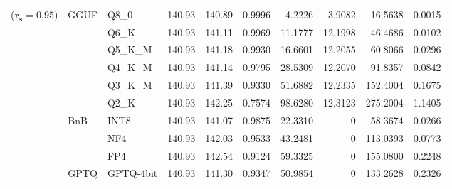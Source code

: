 \begin{table}[t]
{\begin{tabular}{ll l rrrrrrr}
{\small ($\mathbf{r_s{=}0.95}$)} & GGUF & Q8\_0 & 140.93 & 140.89 & 0.9996 & 4.2226 & 3.9082 & 16.5638 & 0.0015 \\
 &  & Q6\_K & 140.93 & 141.11 & 0.9969 & 11.1777 & 12.1998 & 46.4686 & 0.0102 \\
 &  & Q5\_K\_M & 140.93 & 141.18 & 0.9930 & 16.6601 & 12.2055 & 60.8066 & 0.0296 \\
 &  & Q4\_K\_M & 140.93 & 141.14 & 0.9795 & 28.5309 & 12.2070 & 91.8357 & 0.0842 \\
 &  & Q3\_K\_M & 140.93 & 141.39 & \cellcolor{red!18} 0.9330 & \cellcolor{red!18} 51.6882 & 12.2335 & \cellcolor{red!18} 152.4004 & \cellcolor{red!18} 0.1675 \\
 &  & Q2\_K & 140.93 & 142.25 & \cellcolor{red!35} 0.7574 & \cellcolor{red!35} 98.6280 & 12.3123 & \cellcolor{red!35} 275.2004 & \cellcolor{red!35} 1.1405 \\
 & BnB & INT8 & 140.93 & 141.07 & 0.9875 & 22.3310 & \cellcolor{cyan!12} $0$ & 58.3674 & 0.0266 \\
 &  & NF4 & 140.93 & 142.03 & 0.9533 & 43.2481 & \cellcolor{cyan!12} $0$ & 113.0393 & 0.0773 \\
 &  & FP4 & 140.93 & 142.54 & \cellcolor{red!18} 0.9124 & \cellcolor{red!18} 59.3325 & \cellcolor{cyan!12} $0$ & \cellcolor{red!18} 155.0800 & \cellcolor{red!18} 0.2248 \\
 & GPTQ & GPTQ-4bit & 140.93 & 141.30 & \cellcolor{red!18} 0.9347 & \cellcolor{red!18} 50.9854 & \cellcolor{cyan!12} $0$ & \cellcolor{red!18} 133.2628 & \cellcolor{red!18} 0.2326 \\
\bottomrule
\end{tabular}}
\end{table}
